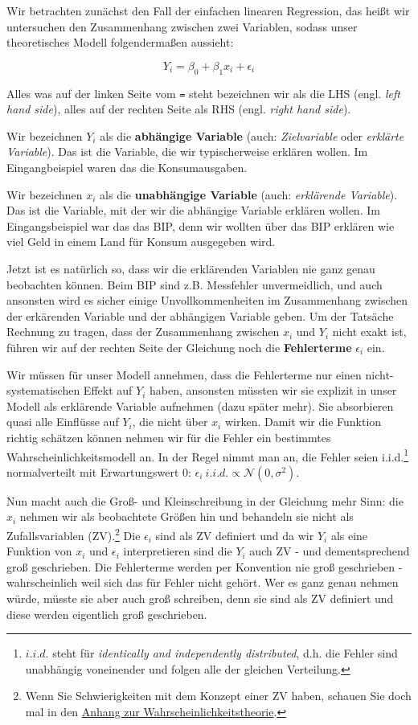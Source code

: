 \documentclass[]{book}
\let\rmarkdownfootnote\footnote%
\def\footnote{\protect\rmarkdownfootnote}
\begin{document}
Wir betrachten zunächst den Fall der einfachen linearen Regression, das
heißt wir untersuchen den Zusammenhang zwischen zwei Variablen, sodass
unser theoretisches Modell folgendermaßen aussieht:

\[Y_i = \beta_0 + \beta_1 x_i + \epsilon_i\]

Alles was auf der linken Seite vom \texttt{=} steht bezeichnen wir als
die LHS (engl. \emph{left hand side}), alles auf der rechten Seite als
RHS (engl. \emph{right hand side}).

Wir bezeichnen \(Y_i\) als die \textbf{abhängige Variable} (auch:
\emph{Zielvariable} oder \emph{erklärte Variable}). Das ist die
Variable, die wir typischerweise erklären wollen. Im Eingangbeispiel
waren das die Konsumausgaben.

Wir bezeichnen \(x_i\) als die \textbf{unabhängige Variable} (auch:
\emph{erklärende Variable}). Das ist die Variable, mit der wir die
abhängige Variable erklären wollen. Im Eingangsbeispiel war das das BIP,
denn wir wollten über das BIP erklären wie viel Geld in einem Land für
Konsum ausgegeben wird.

Jetzt ist es natürlich so, dass wir die erklärenden Variablen nie ganz
genau beobachten können. Beim BIP sind z.B. Messfehler unvermeidlich,
und auch ansonsten wird es sicher einige Unvollkommenheiten im
Zusammenhang zwischen der erkärenden Variable und der abhängigen
Variable geben. Um der Tatsäche Rechnung zu tragen, dass der
Zusammenhang zwischen \(x_i\) und \(Y_i\) nicht exakt ist, führen wir
auf der rechten Seite der Gleichung noch die \textbf{Fehlerterme}
\(\epsilon_i\) ein.

Wir müssen für unser Modell annehmen, dass die Fehlerterme nur einen
nicht-systematischen Effekt auf \(Y_i\) haben, ansonsten müssten wir sie
explizit in unser Modell als erklärende Variable aufnehmen (dazu später
mehr). Sie absorbieren quasi alle Einflüsse auf \(Y_i\), die nicht über
\(x_i\) wirken. Damit wir die Funktion richtig schätzen können nehmen
wir für die Fehler ein bestimmtes Wahrscheinlichkeitsmodell an. In der
Regel nimmt man an, die Fehler seien i.i.d.\footnote{\(i.i.d.\) steht
  für \textit{identically and independently distributed}, d.h. die
  Fehler sind unabhängig voneinender und folgen alle der gleichen
  Verteilung.} normalverteilt mit Erwartungswert 0:
\(\epsilon_i \ i.i.d. \propto \mathcal{N}(0, \sigma^2)\).

Nun macht auch die Groß- und Kleinschreibung in der Gleichung mehr Sinn:
die \(x_i\) nehmen wir als beobachtete Größen hin und behandeln sie
nicht als Zufallsvariablen (ZV).\footnote{Wenn Sie Schwierigkeiten mit
  dem Konzept einer ZV haben, schauen Sie doch mal in den
  \protect\hyperlink{stat-stoch}{Anhang zur Wahrscheinlichkeitstheorie}.}
Die \(\epsilon_i\) sind als ZV definiert und da wir \(Y_i\) als eine
Funktion von \(x_i\) und \(\epsilon_i\) interpretieren sind die \(Y_i\)
auch ZV - und dementsprechend groß geschrieben. Die Fehlerterme werden
per Konvention nie groß geschrieben - wahrscheinlich weil sich das für
Fehler nicht gehört. Wer es ganz genau nehmen würde, müsste sie aber
auch groß schreiben, denn sie sind als ZV definiert und diese werden
eigentlich groß geschrieben.
\end{document}

